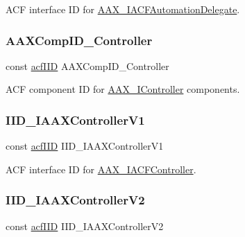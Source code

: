 A\+CF interface ID for \mbox{\hyperlink{a01617}{A\+A\+X\+\_\+\+I\+A\+C\+F\+Automation\+Delegate}}. 

\mbox{\label{a00683_a5c927ea96aceac064ced592799c4070c}} 
\subsubsection{\texorpdfstring{AAXCompID\_Controller}{AAXCompID\_Controller}}
{\footnotesize\ttfamily const \mbox{\hyperlink{a00269_a59df0b41744eee7a066787aaedf97f67}{acf\+I\+ID}} A\+A\+X\+Comp\+I\+D\+\_\+\+Controller}



A\+CF component ID for \mbox{\hyperlink{a01789}{A\+A\+X\+\_\+\+I\+Controller}} components. 

\mbox{\label{a00683_ade31528710cfa399a89bf6bae7854fa0}} 
\subsubsection{\texorpdfstring{IID\_IAAXControllerV1}{IID\_IAAXControllerV1}}
{\footnotesize\ttfamily const \mbox{\hyperlink{a00269_a59df0b41744eee7a066787aaedf97f67}{acf\+I\+ID}} I\+I\+D\+\_\+\+I\+A\+A\+X\+Controller\+V1}



A\+CF interface ID for \mbox{\hyperlink{a01637}{A\+A\+X\+\_\+\+I\+A\+C\+F\+Controller}}. 

\mbox{\label{a00683_abf2eeeaec58a9de670e36a80507320f7}} 
\subsubsection{\texorpdfstring{IID\_IAAXControllerV2}{IID\_IAAXControllerV2}}
{\footnotesize\ttfamily const \mbox{\hyperlink{a00269_a59df0b41744eee7a066787aaedf97f67}{acf\+I\+ID}} I\+I\+D\+\_\+\+I\+A\+A\+X\+Controller\+V2}



